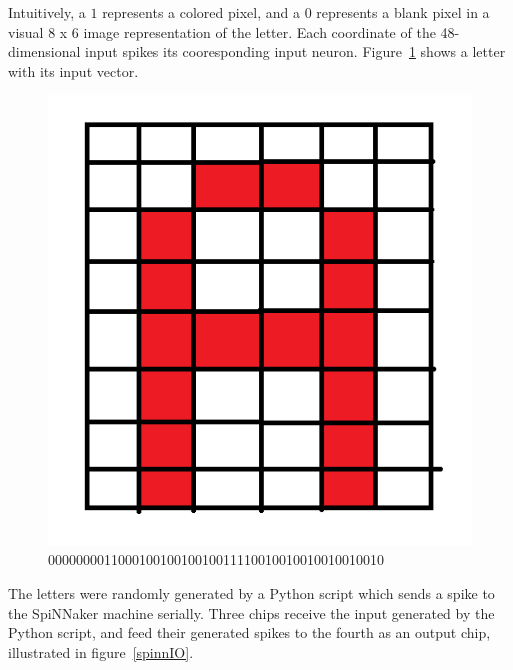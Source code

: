 \documentclass[journal]{./sty/IEEEtran}
\begin{document}
Intuitively, a $1$ represents a colored pixel, and a $0$ represents a blank pixel in a visual $8$ x $6$ image representation of the letter. 
Each coordinate of the 48-dimensional input spikes its cooresponding input neuron. Figure~\ref{fig:A} shows a letter with its input vector.

\begin{figure}
\centering
\includegraphics[scale=0.3]{imgs/A.png}
\caption{000000001100010010010010011110010010010010010010\label{fig:A}}
\end{figure}

The letters were randomly generated by a Python script which sends a spike to the SpiNNaker machine serially. Three chips receive the input generated by the Python script, and feed their generated spikes to the fourth as an output chip, illustrated in figure~\ref{spinnIO}.
\end{document}
